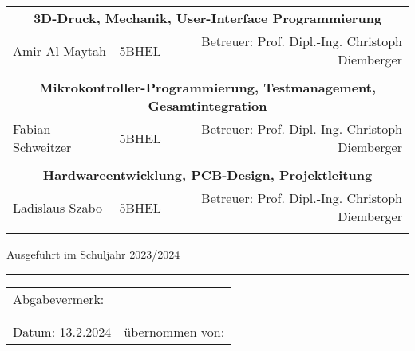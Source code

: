 \documentclass[titlepage,12pt,twoside]{article}
\begin{document}
\begin{titlepage}
	\begin{center}
		\begin{tabular}{llr} 
			\multicolumn{3}{c}{\large{\textbf{3D-Druck, Mechanik, User-Interface Programmierung}}} \\
			\large{Amir Al-Maytah} & \hspace{0.3cm}\large{5BHEL}\hspace{0.3cm} &  \large{Betreuer: Prof. Dipl.-Ing. Christoph Diemberger}\\
			\\
			\multicolumn{3}{c}{\large{\textbf{Mikrokontroller-Programmierung, Testmanagement, Gesamtintegration}}} \\
			\large{Fabian Schweitzer} & \hspace{0.3cm}\large{5BHEL}\hspace{0.3cm} &  \large{Betreuer: Prof. Dipl.-Ing. Christoph Diemberger}\\
			\\
			\multicolumn{3}{c}{\large{\textbf{Hardwareentwicklung, PCB-Design, Projektleitung}}} \\
			\large{Ladislaus Szabo} & \hspace{0.3cm}\large{5BHEL}\hspace{0.3cm} &  \large{Betreuer: Prof. Dipl.-Ing. Christoph Diemberger}\\
			\\
		\end{tabular}
	\end{center}
	
	
	
	\vspace{1.5cm}
	\normalsize
	Ausgeführt im Schuljahr 2023/2024\\
	\vspace{0.7cm}
	\noindent\rule{\textwidth}{1pt}
	\begin{tabular}{lr}
	Abgabevermerk:\\
	\\
	\\
	Datum: 13.2.2024 &\hspace{4cm}   übernommen von:\\
	\end{tabular}
	
	\end{titlepage}
	
	\newpage
	\thispagestyle{empty}
	\clearpage\mbox{}\clearpage

\end{document}
